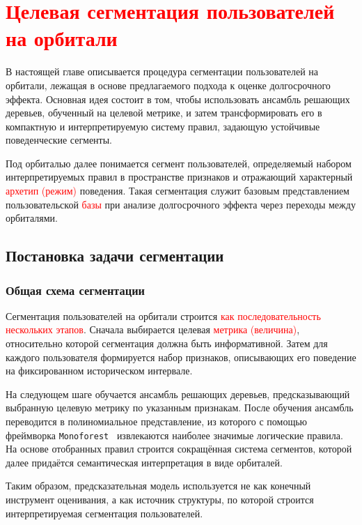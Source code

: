 \section{\textcolor{red}{Целевая сегментация пользователей на орбитали}}
\label{sec:segmentation}

В настоящей главе описывается процедура сегментации пользователей на
орбитали, лежащая в основе предлагаемого подхода к оценке долгосрочного
эффекта. Основная идея состоит в том, чтобы использовать ансамбль
решающих деревьев, обученный на целевой метрике, и затем трансформировать
его в компактную и интерпретируемую систему правил, задающую устойчивые
поведенческие сегменты.

Под орбиталью далее понимается сегмент пользователей, определяемый
набором интерпретируемых правил в пространстве признаков и отражающий
характерный \textcolor{red}{архетип (режим)} поведения. Такая сегментация служит базовым
представлением пользовательской \textcolor{red}{базы} при анализе долгосрочного
эффекта через переходы между орбиталями.

\subsection{Постановка задачи сегментации}
\label{subsec:segmentation_setup}

\subsubsection{Общая схема сегментации}
\label{subsubsec:segmentation_pipeline}

Сегментация пользователей на орбитали строится \textcolor{red}{как последовательность
нескольких этапов}. Сначала выбирается целевая \textcolor{red}{метрика (величина)}, относительно
которой сегментация должна быть информативной. Затем для каждого
пользователя формируется набор признаков, описывающих его поведение
на фиксированном историческом интервале.

На следующем шаге обучается ансамбль решающих деревьев, предсказывающий
выбранную целевую метрику по указанным признакам. После обучения ансамбль
переводится в полиномиальное представление, из которого с помощью
фреймворка \texttt{Monoforest}~\cite{monoforest} извлекаются наиболее
значимые логические правила. На основе отобранных правил строится
сокращённая система сегментов, которой далее придаётся семантическая
интерпретация в виде орбиталей.

Таким образом, предсказательная модель используется не как конечный
инструмент оценивания, а как источник структуры, по которой строится
интерпретируемая сегментация пользователей.

